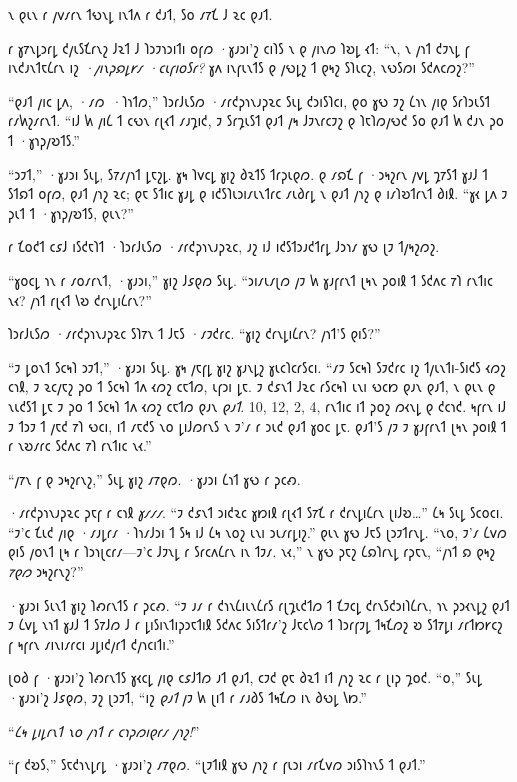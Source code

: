 𐑯 𐑞𐑧𐑯 𐑩 𐑢𐑫𐑥𐑩𐑯 𐑑𐑻𐑯𐑛 𐑦𐑯𐑑𐑵 𐑩 𐑒𐑨𐑑, 𐑕𐑴 𐑥𐑳𐑗 𐑓 𐑷𐑤 𐑞𐑨𐑑.

𐑩 𐑣𐑳𐑯𐑛𐑮𐑩𐑛 𐑒𐑢𐑧𐑕𐑗𐑩𐑯𐑟 𐑓𐑷𐑑 𐑓 𐑐𐑮𐑲𐑪𐑮𐑦𐑑𐑦 𐑴𐑝𐑼 ·𐑣𐑨𐑮𐑦'𐑟 𐑤𐑦𐑐𐑕 𐑯 𐑞 𐑢𐑦𐑯𐑼 𐑐𐑹𐑛 𐑬𐑑: “𐑯, 𐑯 𐑢𐑪𐑑 𐑒𐑲𐑯𐑛 𐑝 𐑦𐑯𐑒𐑨𐑯𐑑𐑱𐑖𐑩𐑯 𐑦𐑟 \emph{·𐑢𐑦𐑯𐑜𐑸𐑛𐑾𐑥 ·𐑤𐑧𐑝𐑦𐑴𐑕𐑩?} 𐑣𐑵 𐑦𐑯𐑝𐑧𐑯𐑑𐑕 𐑞 𐑢𐑻𐑛𐑟 𐑑 𐑞𐑰𐑟 𐑕𐑐𐑧𐑤𐑟, 𐑯𐑻𐑕𐑼𐑦 𐑕𐑒𐑵𐑤𐑼𐑟?”

“𐑞𐑨𐑑 𐑢𐑦𐑤 𐑛𐑵, ·𐑥𐑼~·𐑐𐑪𐑑𐑼,” 𐑐𐑮𐑩𐑓𐑧𐑕𐑼 ·𐑥𐑩𐑒𐑜𐑪𐑯𐑨𐑜𐑷𐑤 𐑕𐑧𐑛 𐑒𐑮𐑦𐑕𐑐𐑤𐑦, 𐑞𐑴 𐑣𐑻 𐑲𐑟 𐑖𐑪𐑯 𐑢𐑦𐑞 𐑕𐑩𐑐𐑮𐑧𐑕𐑑 𐑩𐑥𐑿𐑟𐑥𐑩𐑯𐑑. “𐑦𐑓 𐑿 𐑢𐑦𐑖 𐑑 𐑤𐑻𐑯 𐑩𐑚𐑬𐑑 𐑥𐑨𐑡𐑦𐑒, 𐑲 𐑕𐑩𐑡𐑧𐑕𐑑 𐑞𐑨𐑑 𐑢𐑰 𐑓𐑲𐑯𐑩𐑤𐑲𐑟 𐑞 𐑐𐑱𐑐𐑼𐑢𐑻𐑒 𐑕𐑴 𐑞𐑨𐑑 𐑿 𐑒𐑨𐑯 𐑜𐑴 𐑑 ·𐑣𐑪𐑜𐑢𐑹𐑑𐑕.”

“𐑮𐑲𐑑,” ·𐑣𐑨𐑮𐑦 𐑕𐑧𐑛, 𐑕𐑳𐑥𐑢𐑪𐑑 𐑛𐑱𐑟𐑛. 𐑣𐑰 𐑐𐑫𐑤𐑛 𐑣𐑦𐑟 𐑔𐑷𐑑𐑕 𐑑𐑩𐑜𐑧𐑞𐑼. 𐑞 𐑥𐑸𐑗 𐑝 ·𐑮𐑰𐑟𐑩𐑯 𐑢𐑫𐑛 𐑡𐑳𐑕𐑑 𐑣𐑨𐑓 𐑑 𐑕𐑑𐑸𐑑 𐑴𐑝𐑼, 𐑞𐑨𐑑 𐑢𐑪𐑟 𐑷𐑤; 𐑞𐑱 𐑕𐑑𐑦𐑤 𐑣𐑨𐑛 𐑞 𐑦𐑒𐑕𐑐𐑧𐑮𐑦𐑥𐑧𐑯𐑑𐑩𐑤 𐑥𐑧𐑔𐑩𐑛 𐑯 𐑞𐑨𐑑 𐑢𐑪𐑟 𐑞 𐑦𐑥𐑐𐑹𐑑𐑩𐑯𐑑 𐑔𐑦𐑙. “𐑣𐑬 𐑛𐑵 𐑲 𐑜𐑧𐑑 𐑑 ·𐑣𐑪𐑜𐑢𐑹𐑑𐑕, 𐑞𐑧𐑯?”

𐑩 𐑗𐑴𐑒𐑑 𐑤𐑭𐑓 𐑦𐑕𐑒𐑱𐑐𐑑 ·𐑐𐑮𐑩𐑓𐑧𐑕𐑼 ·𐑥𐑩𐑒𐑜𐑪𐑯𐑨𐑜𐑷𐑤, 𐑨𐑟 𐑦𐑓 𐑦𐑒𐑕𐑑𐑮𐑨𐑒𐑑𐑩𐑛 𐑓𐑮𐑪𐑥 𐑣𐑻 𐑚𐑲 𐑑𐑢𐑰𐑟𐑼𐑟.

“𐑣𐑴𐑤𐑛 𐑪𐑯 𐑩 𐑥𐑴𐑥𐑩𐑯𐑑, ·𐑣𐑨𐑮𐑦,” 𐑣𐑦𐑟 𐑓𐑭𐑞𐑼 𐑕𐑧𐑛. “𐑮𐑦𐑥𐑧𐑥𐑚𐑼 𐑢𐑲 𐑿 𐑣𐑨𐑝𐑩𐑯𐑑 𐑚𐑰𐑯 𐑜𐑴𐑦𐑙 𐑑 𐑕𐑒𐑵𐑤 𐑳𐑐 𐑩𐑯𐑑𐑦𐑤 𐑯𐑬? 𐑢𐑪𐑑 𐑩𐑚𐑬𐑑 𐑘𐑹 𐑒𐑩𐑯𐑛𐑦𐑖𐑩𐑯?”

𐑐𐑮𐑩𐑓𐑧𐑕𐑼 ·𐑥𐑩𐑒𐑜𐑪𐑯𐑨𐑜𐑷𐑤 𐑕𐑐𐑳𐑯 𐑑 𐑓𐑱𐑕 ·𐑥𐑲𐑒𐑩𐑤. “𐑣𐑦𐑟 𐑒𐑩𐑯𐑛𐑦𐑖𐑩𐑯? 𐑢𐑪𐑑'𐑕 𐑞𐑦𐑕?”

“𐑲 𐑛𐑴𐑯𐑑 𐑕𐑤𐑰𐑐 𐑮𐑲𐑑,” ·𐑣𐑨𐑮𐑦 𐑕𐑧𐑛. 𐑣𐑰 𐑢𐑱𐑝𐑛 𐑣𐑦𐑟 𐑣𐑨𐑯𐑛𐑟 𐑣𐑧𐑤𐑐𐑤𐑩𐑕𐑤𐑦. “𐑥𐑲 𐑕𐑤𐑰𐑐 𐑕𐑲𐑒𐑩𐑤 𐑦𐑟 𐑑𐑢𐑧𐑯𐑑𐑦-𐑕𐑦𐑒𐑕 𐑬𐑼𐑟 𐑤𐑪𐑙, 𐑲 𐑷𐑤𐑢𐑱𐑟 𐑜𐑴 𐑑 𐑕𐑤𐑰𐑐 𐑑𐑵 𐑬𐑼𐑟 𐑤𐑱𐑑𐑼, 𐑧𐑝𐑮𐑦 𐑛𐑱. 𐑲 𐑒𐑭𐑯𐑑 𐑓𐑷𐑤 𐑩𐑕𐑤𐑰𐑐 𐑧𐑯𐑦 𐑻𐑤𐑽 𐑞𐑨𐑯 𐑞𐑨𐑑, 𐑯 𐑞𐑧𐑯 𐑞 𐑯𐑧𐑒𐑕𐑑 𐑛𐑱 𐑲 𐑜𐑴 𐑑 𐑕𐑤𐑰𐑐 𐑑𐑵 𐑬𐑼𐑟 𐑤𐑱𐑑𐑼 𐑞𐑨𐑯 \emph{𐑞𐑨𐑑}. 10\pm, 12\am, 2\am, 4\am, 𐑩𐑯𐑑𐑦𐑤 𐑦𐑑 𐑜𐑴𐑟 𐑼𐑬𐑯𐑛 𐑞 𐑒𐑤𐑪𐑒. 𐑰𐑝𐑩𐑯 𐑦𐑓 𐑲 𐑑𐑮𐑲 𐑑 𐑢𐑱𐑒 𐑳𐑐 𐑻𐑤𐑦, 𐑦𐑑 𐑥𐑱𐑒𐑕 𐑯𐑴 𐑛𐑦𐑓𐑼𐑩𐑯𐑕 𐑯 𐑲'𐑥 𐑩 𐑮𐑧𐑒 𐑞𐑨𐑑 𐑣𐑴𐑤 𐑛𐑱. 𐑞𐑨𐑑'𐑕 𐑢𐑲 𐑲 𐑣𐑨𐑝𐑩𐑯𐑑 𐑚𐑰𐑯 𐑜𐑴𐑦𐑙 𐑑 𐑩 𐑯𐑹𐑥𐑩𐑤 𐑕𐑒𐑵𐑤 𐑳𐑐 𐑩𐑯𐑑𐑦𐑤 𐑯𐑬.”

“𐑢𐑳𐑯 𐑝 𐑞 𐑮𐑰𐑟𐑩𐑯𐑟,” 𐑕𐑧𐑛 𐑣𐑦𐑟 𐑥𐑳𐑞𐑼. ·𐑣𐑨𐑮𐑦 𐑖𐑪𐑑 𐑣𐑻 𐑩 𐑜𐑤𐑺.

·𐑥𐑩𐑒𐑜𐑪𐑯𐑨𐑜𐑷𐑤 𐑜𐑱𐑝 𐑩 𐑤𐑪𐑙 \emph{𐑣𐑥𐑥𐑥}. “𐑲 𐑒𐑭𐑯𐑑 𐑮𐑦𐑒𐑷𐑤 𐑣𐑽𐑦𐑙 𐑩𐑚𐑬𐑑 𐑕𐑳𐑗 𐑩 𐑒𐑩𐑯𐑛𐑦𐑖𐑩𐑯 𐑚𐑦𐑓𐑹…” 𐑖𐑰 𐑕𐑧𐑛 𐑕𐑤𐑴𐑤𐑦. “𐑲'𐑤 𐑗𐑧𐑒 𐑢𐑦𐑞 ·𐑥𐑨𐑛𐑩𐑥 ·𐑐𐑪𐑥𐑓𐑮𐑦 𐑑 𐑕𐑰 𐑦𐑓 𐑖𐑰 𐑯𐑴𐑟 𐑧𐑯𐑦 𐑮𐑧𐑥𐑩𐑛𐑦𐑟.” 𐑞𐑧𐑯 𐑣𐑻 𐑓𐑱𐑕 𐑚𐑮𐑲𐑑𐑩𐑯𐑛. “𐑯𐑴, 𐑲'𐑥 𐑖𐑫𐑼 𐑞𐑦𐑕 𐑢𐑴𐑯𐑑 𐑚𐑰 𐑩 𐑐𐑮𐑪𐑚𐑤𐑩𐑥—𐑲'𐑤 𐑓𐑲𐑯𐑛 𐑩 𐑕𐑩𐑤𐑵𐑖𐑩𐑯 𐑦𐑯 𐑑𐑲𐑥. 𐑯𐑬,” 𐑯 𐑣𐑻 𐑜𐑱𐑟 𐑖𐑸𐑐𐑩𐑯𐑛 𐑩𐑜𐑱𐑯, “𐑢𐑪𐑑 𐑸 𐑞𐑰𐑟 \emph{𐑳𐑞𐑼} 𐑮𐑰𐑟𐑩𐑯𐑟?”

·𐑣𐑨𐑮𐑦 𐑕𐑧𐑯𐑑 𐑣𐑦𐑟 𐑐𐑺𐑩𐑯𐑑𐑕 𐑩 𐑜𐑤𐑺. “𐑲 𐑨𐑥 𐑩 𐑒𐑪𐑯𐑖𐑦𐑧𐑯𐑖𐑩𐑕 𐑩𐑚𐑡𐑧𐑒𐑑𐑼 𐑑 𐑗𐑲𐑤𐑛 𐑒𐑩𐑯𐑕𐑒𐑮𐑦𐑐𐑖𐑩𐑯, 𐑪𐑯 𐑜𐑮𐑬𐑯𐑛𐑟 𐑞𐑨𐑑 𐑲 𐑖𐑫𐑛 𐑯𐑪𐑑 𐑣𐑨𐑓 𐑑 𐑕𐑳𐑓𐑼 𐑓 𐑩 𐑛𐑦𐑕𐑦𐑯𐑑𐑦𐑜𐑮𐑱𐑑𐑦𐑙 𐑕𐑒𐑵𐑤 𐑕𐑦𐑕𐑑𐑩𐑥'𐑟 𐑓𐑱𐑤𐑘𐑼 𐑑 𐑐𐑮𐑩𐑝𐑲𐑛 𐑑𐑰𐑗𐑼𐑟 𐑹 𐑕𐑑𐑳𐑛𐑦 𐑥𐑩𐑑𐑽𐑾𐑤𐑟 𐑝 𐑰𐑝𐑩𐑯 𐑥𐑦𐑯𐑦𐑥𐑩𐑤𐑦 𐑨𐑛𐑦𐑒𐑢𐑩𐑑 𐑒𐑢𐑪𐑤𐑦𐑑𐑦.”

𐑚𐑴𐑔 𐑝 ·𐑣𐑨𐑮𐑦'𐑟 𐑐𐑺𐑩𐑯𐑑𐑕 𐑣𐑬𐑤𐑛 𐑢𐑦𐑞 𐑤𐑭𐑓𐑑𐑼 𐑨𐑑 𐑞𐑨𐑑, 𐑤𐑲𐑒 𐑞𐑱 𐑔𐑷𐑑 𐑦𐑑 𐑢𐑪𐑟 𐑷𐑤 𐑩 𐑚𐑦𐑜 𐑡𐑴𐑒. “𐑴,” 𐑕𐑧𐑛 ·𐑣𐑨𐑮𐑦'𐑟 𐑓𐑭𐑞𐑼, 𐑲𐑟 𐑚𐑮𐑲𐑑, “𐑦𐑟 \emph{𐑞𐑨𐑑} 𐑢𐑲 𐑿 𐑚𐑦𐑑 𐑩 𐑥𐑨𐑔𐑕 𐑑𐑰𐑗𐑼 𐑦𐑯 𐑔𐑻𐑛 𐑘𐑽.”

“\emph{𐑖𐑰 𐑛𐑦𐑛𐑩𐑯𐑑 𐑯𐑴 𐑢𐑪𐑑 𐑩 𐑤𐑪𐑜𐑼𐑦𐑞𐑩𐑥 𐑢𐑪𐑟!}”

“𐑝 𐑒𐑹𐑕,” 𐑕𐑱𐑒𐑪𐑯𐑛𐑩𐑛 ·𐑣𐑨𐑮𐑦'𐑟 𐑥𐑳𐑞𐑼. “𐑚𐑲𐑑𐑦𐑙 𐑣𐑻 𐑢𐑪𐑟 𐑩 𐑝𐑧𐑮𐑦 𐑥𐑩𐑗𐑫𐑼 𐑮𐑦𐑕𐑐𐑪𐑯𐑕 𐑑 𐑞𐑨𐑑.”

